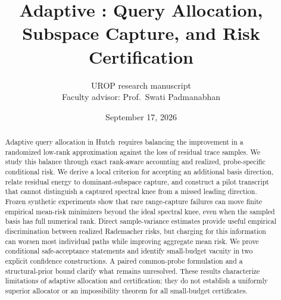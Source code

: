 \documentclass[11pt,letterpaper]{article}
\title{Adaptive \hutchpp: Query Allocation,\\Subspace Capture, and Risk Certification}
\author{UROP research manuscript\\
 \small Faculty advisor: Prof.\ Swati Padmanabhan}
\date{September 17, 2026}
\theoremstyle{definition}
\theoremstyle{remark}
\numberwithin{equation}{section}
\newcommand{\hutchpp}{Hutch\raisebox{.35ex}{\scriptsize++}}
\begin{document}
\maketitle
\begin{abstract}
Adaptive query allocation in \hutchpp\ requires balancing the improvement in a
randomized low-rank approximation against the loss of residual trace samples.
We study this balance through exact rank-aware accounting and realized,
probe-specific conditional risk. We derive a local criterion for accepting an
additional basis direction, relate residual energy to dominant-subspace
capture, and construct a pilot transcript that cannot distinguish a captured
spectral knee from a missed leading direction. Frozen synthetic experiments
show that rare range-capture failures can move finite empirical mean-risk
minimizers beyond the ideal spectral knee, even when the sampled basis has
full numerical rank. Direct sample-variance estimates provide useful
empirical discrimination between realized Rademacher risks, but charging for
this information can worsen most individual paths while improving aggregate
mean risk. We prove conditional safe-acceptance statements and identify
small-budget vacuity in two explicit confidence constructions. A paired
common-probe formulation and a structural-prior bound clarify what remains
unresolved. These results characterize limitations of adaptive allocation
and certification; they do not establish a uniformly superior allocator or
an impossibility theorem for all small-budget certificates.
\end{abstract}












\clearpage
\appendix


\end{document}
